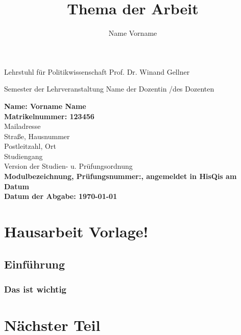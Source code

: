 \documentclass{Hausarbeit}
\author{Name Vorname}
\title{Thema der Arbeit}
\begin{document}
\begin{titlepage}

        {Lehrstuhl für Politikwissenschaft}
        {Prof. Dr. Winand Gellner}

    \vspace{4cm}

        {Semester der Lehrveranstaltung}
        {Name der Dozentin /des Dozenten}

    \titel{\thetitle}

    \vspace*{\fill}

    \begin{flushleft}
        \textbf{Name: Vorname Name}\\
        \textbf{Matrikelnummer: 123456}\\[0.5cm]
        Mailadresse\\
        Straße, Hausnummer\\
        Postleitzahl, Ort\\[0.5cm]
        Studiengang\\
        Version der Studien- u. Prüfungsordnung\\[2cm]
        \textbf{Modulbezeichnung, Prüfungsnummer:, angemeldet in HisQis am Datum}\\
        \textbf{Datum der Abgabe: \today}
    \end{flushleft}

\end{titlepage}

\tableofcontents
\newpage

    

\section{Hausarbeit Vorlage!}
\blindtext
\subsection{Einführung}
\blindtext
\subsubsection{Das ist wichtig}
\blindtext
\section{Nächster Teil}
\blindtext
\end{document}
